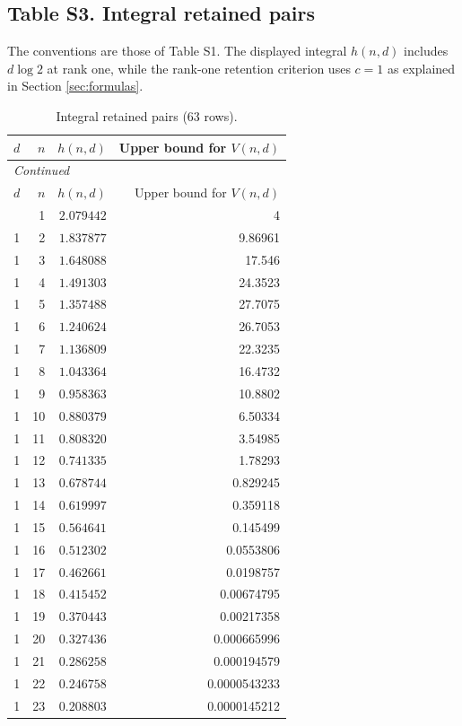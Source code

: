 \documentclass[12pt]{amsart}
\theoremstyle{remark}
\theoremstyle{definition}
\numberwithin{equation}{section}
\begin{document}
\subsection*{Table S3. Integral retained pairs}
The conventions are those of Table S1. The displayed integral $h(n,d)$
includes $d\log 2$ at rank one, while the rank-one retention criterion uses
$c=1$ as explained in Section \ref{sec:formulas}.
\begingroup
\small
\begin{longtable}{rrrr}
\caption{Integral retained pairs (63 rows).}\label{tab:s3}\\
\toprule
$d$ & $n$ & $h(n,d)$ & Upper bound for $V(n,d)$ \\
\midrule
\endfirsthead
\multicolumn{4}{l}{\textit{Continued}}\\
\toprule
$d$ & $n$ & $h(n,d)$ & Upper bound for $V(n,d)$ \\
\midrule
\endhead
\midrule
\endfoot
\bottomrule
\endlastfoot
1 & 1 & $2.079442$ & 4 \\
1 & 2 & $1.837877$ & 9.86961 \\
1 & 3 & $1.648088$ & 17.546 \\
1 & 4 & $1.491303$ & 24.3523 \\
1 & 5 & $1.357488$ & 27.7075 \\
1 & 6 & $1.240624$ & 26.7053 \\
1 & 7 & $1.136809$ & 22.3235 \\
1 & 8 & $1.043364$ & 16.4732 \\
1 & 9 & $0.958363$ & 10.8802 \\
1 & 10 & $0.880379$ & 6.50334 \\
1 & 11 & $0.808320$ & 3.54985 \\
1 & 12 & $0.741335$ & 1.78293 \\
1 & 13 & $0.678744$ & 0.829245 \\
1 & 14 & $0.619997$ & 0.359118 \\
1 & 15 & $0.564641$ & 0.145499 \\
1 & 16 & $0.512302$ & 0.0553806 \\
1 & 17 & $0.462661$ & 0.0198757 \\
1 & 18 & $0.415452$ & 0.00674795 \\
1 & 19 & $0.370443$ & 0.00217358 \\
1 & 20 & $0.327436$ & 0.000665996 \\
1 & 21 & $0.286258$ & 0.000194579 \\
1 & 22 & $0.246758$ & 0.0000543233 \\
1 & 23 & $0.208803$ & 0.0000145212 \\

\end{longtable}
\end{document}

